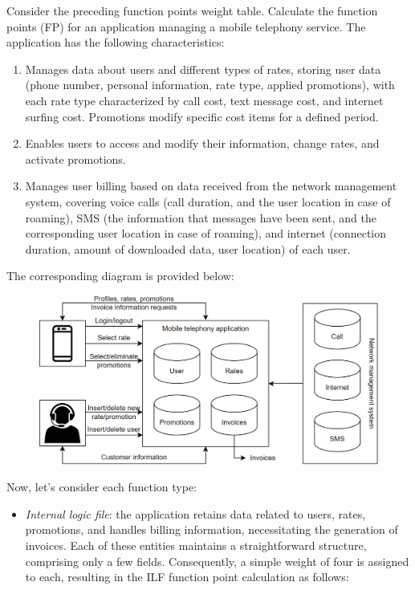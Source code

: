 \begin{example}
    Consider the preceding function points weight table. 
    Calculate the function points (FP) for an application managing a mobile telephony service. 
    The application has the following characteristics:
    \begin{enumerate}
        \item Manages data about users and different types of rates, storing user data (phone number, personal information, rate type, applied promotions), with each rate type characterized by call cost, text message cost, and internet surfing cost. 
            Promotions modify specific cost items for a defined period.
        \item Enables users to access and modify their information, change rates, and activate promotions.
        \item Manages user billing based on data received from the network management system, covering voice calls (call duration, and the user location in case of roaming), SMS (the information that messages have been sent, and the corresponding user location in case of roaming), and internet (connection duration, amount of downloaded data, user location) of each user.
    \end{enumerate}
    The corresponding diagram is provided below:
    \begin{figure}[H]
        \centering
        \includegraphics[width=0.75\linewidth]{images/fp.png}
    \end{figure}
    Now, let's consider each function type:
    \begin{itemize}
        \item \textit{Internal logic file}: the application retains data related to users, rates, promotions, and handles billing information, necessitating the generation of invoices.
            Each of these entities maintains a straightforward structure, comprising only a few fields. 
            Consequently, a simple weight of four is assigned to each, resulting in the ILF function point calculation as follows:

\end{itemize}
\end{example}
